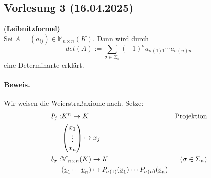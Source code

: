 \documentclass[9pt]{article} %
\begin{document}
\subsection{Vorlesung 3 (16.04.2025)}
\begin{prop} (\textbf{Leibnitzformel)} \\ 
Sei $A = (a_{ij}) \in \mathbb{M}_{n \times n} (K)$. Dann wird durch 
\begin{equation} \label{eq:leibnitzformel}
    det(A) := \sum_{\sigma \in \Sigma_n} (-1)^{\sigma} a_{\sigma(1) 1}   \cdots a_{\sigma(n) n}
\end{equation}
eine Determinante erklärt. 
\paragraph{Beweis.} Wir weisen die Weierstraßaxiome nach. Setze: 
\begin{align*}
    P_j: & K^n \rightarrow K & \text{Projektion} \\
    & \begin{pmatrix} x_1 \\ \vdots \\ x_n  \end{pmatrix} \mapsto x_j \\
    b_{\sigma}: & \mathbb{M}_{n \times n}(K) \rightarrow K & (\sigma \in \Sigma_n) \\
    & (\underline{v}_1 \cdots \underline{v}_n) \mapsto P_{\sigma(1)} (\underline{v}_1) \cdots  P_{\sigma(n)} (\underline{v}_n)
\end{align*}


\end{prop}
\end{document}
